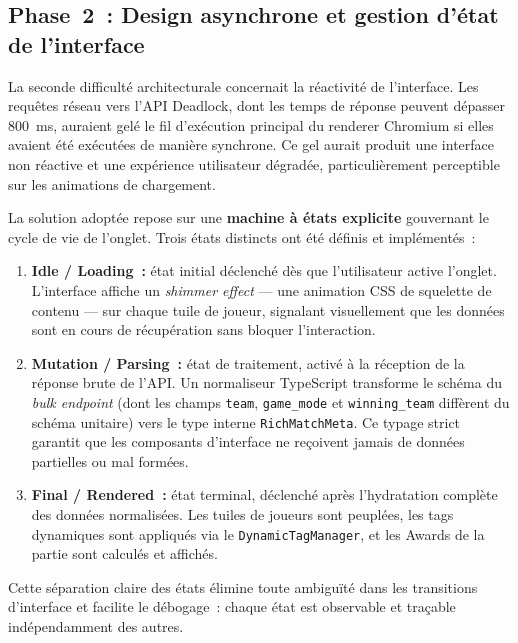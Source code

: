 \documentclass[12pt,a4paper]{article}
\begin{document}
\subsection{Phase~2~: Design asynchrone et gestion d'état de l'interface}

La seconde difficulté architecturale concernait la réactivité de l'interface. Les requêtes réseau vers l'API Deadlock, dont les temps de réponse peuvent dépasser 800~ms, auraient gelé le fil d'exécution principal du renderer Chromium si elles avaient été exécutées de manière synchrone. Ce gel aurait produit une interface non réactive et une expérience utilisateur dégradée, particulièrement perceptible sur les animations de chargement.

La solution adoptée repose sur une \textbf{machine à états explicite} gouvernant le cycle de vie de l'onglet. Trois états distincts ont été définis et implémentés~:

\begin{enumerate}[leftmargin=*, label=\textbf{\arabic*.}]
  \item \textbf{Idle / Loading~:} état initial déclenché dès que l'utilisateur active l'onglet. L'interface affiche un \textit{shimmer effect} --- une animation CSS de squelette de contenu --- sur chaque tuile de joueur, signalant visuellement que les données sont en cours de récupération sans bloquer l'interaction.

  \item \textbf{Mutation / Parsing~:} état de traitement, activé à la réception de la réponse brute de l'API. Un normaliseur TypeScript transforme le schéma du \textit{bulk endpoint} (dont les champs \texttt{team}, \texttt{game\_mode} et \texttt{winning\_team} diffèrent du schéma unitaire) vers le type interne \texttt{RichMatchMeta}. Ce typage strict garantit que les composants d'interface ne reçoivent jamais de données partielles ou mal formées.

  \item \textbf{Final / Rendered~:} état terminal, déclenché après l'hydratation complète des données normalisées. Les tuiles de joueurs sont peuplées, les tags dynamiques sont appliqués via le \texttt{DynamicTagManager}, et les Awards de la partie sont calculés et affichés.
\end{enumerate}

Cette séparation claire des états élimine toute ambiguïté dans les transitions d'interface et facilite le débogage~: chaque état est observable et traçable indépendamment des autres.
\end{document}
